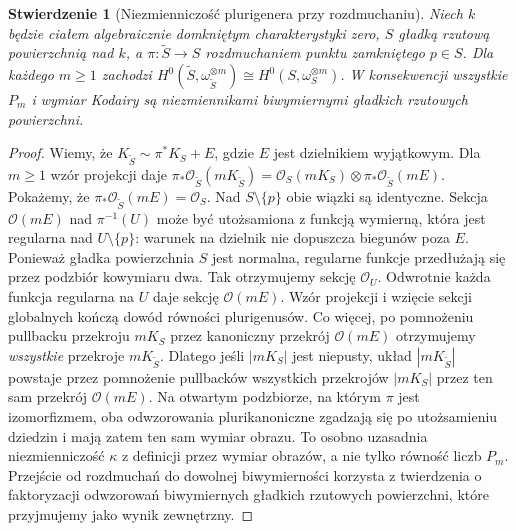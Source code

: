 \documentclass[11pt,a4paper,openany]{report}
\numberwithin{equation}{section}
\theoremstyle{plain}
\newtheorem{stwierdzenie}[twierdzenie]{Stwierdzenie}
\theoremstyle{definition}
\theoremstyle{remark}
\begin{document}
\begin{stwierdzenie}[Niezmienniczość plurigenera przy rozdmuchaniu]
\label{st:ga8-plurigenera-blowup}
Niech $k$ będzie ciałem algebraicznie domkniętym
charakterystyki zero, $S$ gładką rzutową powierzchnią
nad $k$, a $\pi:\widetilde S\to S$ rozdmuchaniem
punktu zamkniętego $p\in S$.
Dla każdego $m\ge1$ zachodzi
$H^0(\widetilde S,\omega_{\widetilde S}^{\otimes m})
\cong H^0(S,\omega_S^{\otimes m})$.
W konsekwencji wszystkie $P_m$ i wymiar Kodairy
są niezmiennikami biwymiernymi gładkich
rzutowych powierzchni.
\end{stwierdzenie}
\begin{proof}
Wiemy, że $K_{\widetilde S}\sim\pi^*K_S+E$,
gdzie $E$ jest dzielnikiem wyjątkowym. Dla $m\ge1$
wzór projekcji daje
$\pi_*\mathcal O_{\widetilde S}(mK_{\widetilde S})
=\mathcal O_S(mK_S)\otimes\pi_*\mathcal O_{\widetilde S}(mE)$.
Pokażemy, że $\pi_*\mathcal O_{\widetilde S}(mE)
=\mathcal O_S$. Nad $S\setminus\{p\}$ obie wiązki
są identyczne. Sekcja $\mathcal O(mE)$ nad
$\pi^{-1}(U)$ może być utożsamiona z funkcją wymierną,
która jest regularna nad $U\setminus\{p\}$:
warunek na dzielnik nie dopuszcza biegunów poza $E$.
Ponieważ gładka powierzchnia $S$ jest normalna,
regularne funkcje przedłużają się przez podzbiór
kowymiaru dwa. Tak otrzymujemy sekcję $\mathcal O_U$.
Odwrotnie każda funkcja regularna na $U$ daje
sekcję $\mathcal O(mE)$. Wzór projekcji i wzięcie
sekcji globalnych kończą dowód równości plurigenusów.
Co więcej, po pomnożeniu pullbacku przekroju $mK_S$
przez kanoniczny przekrój $\mathcal O(mE)$ otrzymujemy
\emph{wszystkie} przekroje $mK_{\widetilde S}$. Dlatego
jeśli $|mK_S|$ jest niepusty, układ $|mK_{\widetilde S}|$
powstaje przez pomnożenie pullbacków wszystkich przekrojów
$|mK_S|$ przez ten sam przekrój $\mathcal O(mE)$.
Na otwartym podzbiorze, na którym $\pi$ jest izomorfizmem,
oba odwzorowania plurikanoniczne zgadzają się po utożsamieniu
dziedzin i mają zatem ten sam wymiar obrazu.
To osobno uzasadnia niezmienniczość $\kappa$ z definicji
przez wymiar obrazów, a nie tylko równość liczb $P_m$.
Przejście od rozdmuchań do dowolnej biwymierności
korzysta z twierdzenia o faktoryzacji odwzorowań
biwymiernych gładkich rzutowych powierzchni,
które przyjmujemy jako wynik zewnętrzny.
\end{proof}
\end{document}
